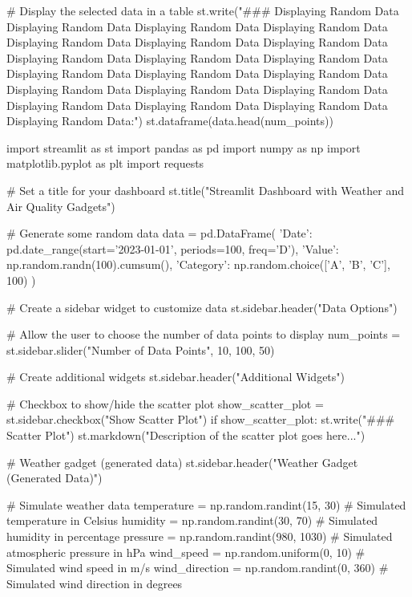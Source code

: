 # Display the selected data in a table
st.write("### Displaying Random Data Displaying Random Data Displaying Random Data Displaying Random Data Displaying Random Data Displaying Random Data Displaying Random Data Displaying Random Data Displaying Random Data Displaying Random Data Displaying Random Data Displaying Random Data Displaying Random Data Displaying Random Data Displaying Random Data Displaying Random Data Displaying Random Data Displaying Random Data Displaying Random Data Displaying Random Data:")
st.dataframe(data.head(num_points))











import streamlit as st
import pandas as pd
import numpy as np
import matplotlib.pyplot as plt
import requests

# Set a title for your dashboard
st.title("Streamlit Dashboard with Weather and Air Quality Gadgets")

# Generate some random data
data = pd.DataFrame({
    'Date': pd.date_range(start='2023-01-01', periods=100, freq='D'),
    'Value': np.random.randn(100).cumsum(),
    'Category': np.random.choice(['A', 'B', 'C'], 100)
})

# Create a sidebar widget to customize data
st.sidebar.header("Data Options")

# Allow the user to choose the number of data points to display
num_points = st.sidebar.slider("Number of Data Points", 10, 100, 50)

 




# Create additional widgets
st.sidebar.header("Additional Widgets")

# Checkbox to show/hide the scatter plot
show_scatter_plot = st.sidebar.checkbox("Show Scatter Plot")
if show_scatter_plot:
    st.write("### Scatter Plot")
    st.markdown("Description of the scatter plot goes here...")

# Weather gadget (generated data)
st.sidebar.header("Weather Gadget (Generated Data)")

# Simulate weather data
temperature = np.random.randint(15, 30)  # Simulated temperature in Celsius
humidity = np.random.randint(30, 70)  # Simulated humidity in percentage
pressure = np.random.randint(980, 1030)  # Simulated atmospheric pressure in hPa
wind_speed = np.random.uniform(0, 10)  # Simulated wind speed in m/s
wind_direction = np.random.randint(0, 360)  # Simulated wind direction in degrees

